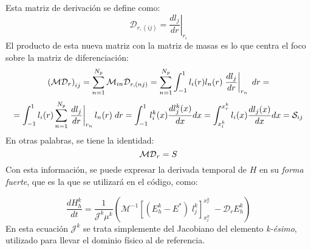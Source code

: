 \documentclass[11pt,a4paper,twoside,pdf]{article}
\numberwithin{equation}{section}
\begin{document}
Esta matriz de derivación se define como:
\begin{equation}
    \mathcal{D}_{r,(ij)}=\left.\frac{dl_j}{dr}\right|_{r_i}
\end{equation}
El producto de esta nueva matriz con la matriz de masas es lo que centra el foco sobre la matriz de diferenciación:
\begin{equation}
    \left(\mathcal{MD}_r\right)_{ij}=\sum^{N_p}_{n=1}\mathcal{M}_{in}\mathcal{D}_{r,(nj)}=\sum^{N_p}_{n=1}\int^1_{-1}l_i(r)l_n(r)\left.\frac{dl_j}{dr}\right|_{r_n}\;dr= \notag
\end{equation}
\begin{equation}
    =\int^1_{-1}l_i(r)\sum^{N_p}_{n=1}\left.\frac{dl_j}{dr}\right|_{r_n}l_n(r)\;dr=\int_{-1}^1l_i^k(x)\frac{dl_j^k(x)}{dx}dx=\int_{x^k_l}^{x^k_r}l_i(x)\frac{dl_j(x)}{dx}dx  =\mathcal{S}_{ij}
    \notag
\end{equation}
En otras palabras, se tiene la identidad:
\begin{equation}
    \mathcal{MD}_r=S\notag
\end{equation}
Con esta información, se puede expresar la derivada temporal de $H$ en su \textit{forma fuerte}, que es la que se utilizará en el código, como:
\begin{comment}

\begin{equation}
       \frac{dH_h^k}{dt}=\frac{1}{J^k\mu^k}\left(-\mathcal{M}^{-1}\left[l^k(x)E^*\right]^{x_r^k}_{x_l^k}\;-\mathcal{D}_rE^k_h\right)\notag \notag
\end{equation}

Y siguiendo con la \textit{forma fuerte}:
    
\end{comment}
\begin{equation}
    \frac{dH_h^k}{dt}=\frac{1}{\mathcal{J}^k\mu^k}\left(\mathcal{M}^{-1}\left[(E^k_h-E^*)\;l_j^k\right]^{x_r^k}_{x_l^k}\;-\mathcal{D}_rE^k_h\right)
    \label{eqdH}
\end{equation}
En esta ecuación $\mathcal{J}^k$ se trata simplemente del Jacobiano del elemento \textit{k-ésimo}, utilizado para llevar el dominio físico al de referencia. 
\newpage
\end{document}

